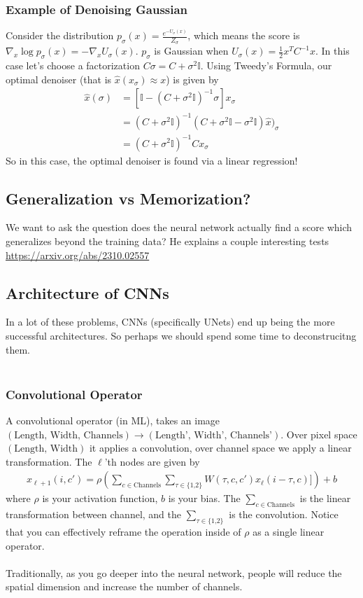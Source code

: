 \subsubsection{Example of Denoising Gaussian}
Consider the distribution $p_\sigma(x) = \frac{e^{- U_\sigma (x)}}{Z_\sigma}$, which means the score is $\nabla_x \log p_\sigma(x) = - \nabla_x U_\sigma(x)$. $p_\sigma$ is Gaussian when $U_\sigma(x) = \frac{1}{2}x^T C^{-1} x$. In this case let's choose a factorization $C \sigma = C + \sigma^2 \mathbb I$. Using Tweedy's Formula, our optimal denoiser (that is $\hat x(x_\sigma) \approx x$) is given by
\begin{align}
	\hat x(\sigma) & = [\mathbb I - (C + \sigma^2 \mathbb I)^{-1} \sigma] x_\sigma \\
	& = (C + \sigma^2 \mathbb I)^{-1} (C + \sigma^2 \mathbb I  - \sigma^2 \mathbb I) \hat x)_\sigma  \\
	& = (C + \sigma^2 \mathbb I)^{-1} C x_\sigma
\end{align}
So in this case, the optimal denoiser is found via a linear regression!

\subsection{Generalization vs Memorization?} 
We want to ask the question does the neural network actually find a score which generalizes beyond the training data? He explains a couple interesting tests \url{https://arxiv.org/abs/2310.02557}

\subsection{Architecture of CNNs}
In a lot of these problems, CNNs (specifically UNets) end up being the more successful architectures. So perhaps we should spend some time to deconstrucitng them.
\\
\\
\subsubsection{Convolutional Operator}
A convolutional operator (in ML), takes an image $(\text{Length, Width, Channels}) \to (\text{Length', Width', Channels'})$. Over pixel space $(\text{Length, Width})$ it applies a convolution, over channel space we apply a linear transformation. The $\ell$'th nodes are given by
\begin{align}
	x_{\ell + 1}(i, c') = \rho \left(\sum_{c \in \text{Channels}} \sum_{\tau \in {\text{\{1,2\}}}} W(\tau, c, c') x_\ell (i - \tau, c)] \right) + b
\end{align}
where $\rho$ is your activation function, $b$ is your bias. The $\sum_{c \in \text{Channels}}$ is the linear transformation between channel, and the $\sum_{\tau \in {\text{\{1,2\}}}}$ is the convolution. Notice that you can effectively reframe the operation inside of $\rho$ as a single linear operator.
\\
\\
Traditionally, as you go deeper into the neural network, people will reduce the spatial dimension and increase the number of channels.

